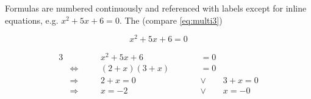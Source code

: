 Formulas are numbered continuously and referenced with labels except for inline equations, e.g. \(x^2+5x+6=0\). The (compare \ref{eq:multi3})

\begin{equation}
	\label{eq:simple}
	x^2+5x+6=0
\end{equation}

\begin{alignat}{3}
	& \quad && x^2+5x+6                   \qquad && = 0  \label{eq:multi1} \\
	& \Leftrightarrow \quad && (2+x)(3+x) \qquad && = 0 \label{eq:multi2} \\
	& \Rightarrow     \quad && 2+x=0      \qquad && \lor \qquad 3+x=0 \label{eq:multi3} \\
	& \Rightarrow 	  \quad && x=-2       \qquad && \lor \qquad x =-0 \label{eq:multi4} 
\end{alignat}

